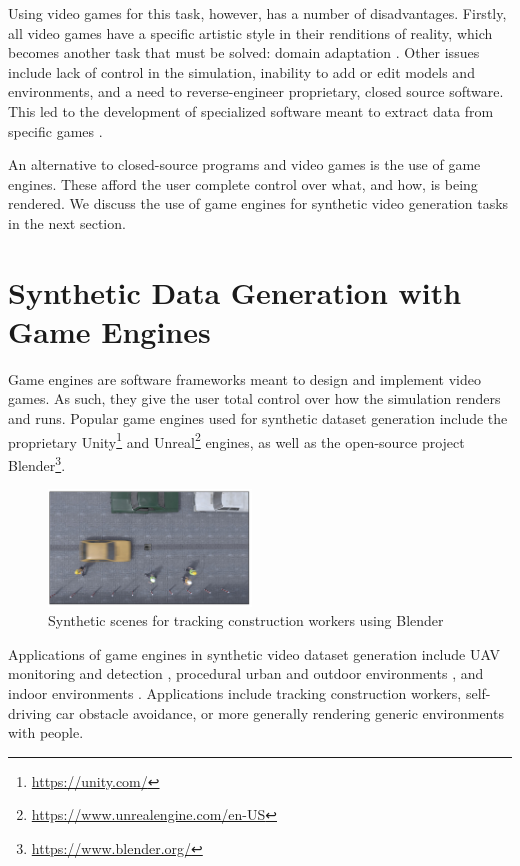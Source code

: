 Using video games for this task, however, has a number of disadvantages. Firstly, all video games have a specific artistic style in their renditions of reality, which becomes another task that must be solved: domain adaptation \cite{wu2019squeezesegv2,wang2019learning}. Other issues include lack of control in the simulation, inability to add or edit models and environments, and a need to reverse-engineer proprietary, closed source software. This led to the development of specialized software meant to extract data from specific games \cite{doan2018g2d}.

An alternative to closed-source programs and video games is the use of game engines. These afford the user complete control over what, and how, is being rendered. We discuss the use of game engines for synthetic video generation tasks in the next section.

\section{Synthetic Data Generation with Game Engines}
\label{sec:graphics-engines}

Game engines are software frameworks meant to design and implement video games. As such, they give the user total control over how the simulation renders and runs. Popular game engines used for synthetic dataset generation include the proprietary Unity\footnote{\url{https://unity.com/}} and Unreal\footnote{\url{https://www.unrealengine.com/en-US}} engines, as well as the open-source project Blender\footnote{\url{https://www.blender.org/}}.


\begin{figure}
    \centering
    \includegraphics[width=0.48\textwidth]{src/img/reated-pics/construction-worker-tracking.jpg}
    \caption{Synthetic scenes for tracking construction workers using Blender\cite{neuhausen2020using}}
    \label{fig:relatex-example-construction-workers}
\end{figure}


Applications of game engines in synthetic video dataset generation include UAV monitoring and detection \cite{barisic2022sim2air}, procedural urban and outdoor environments \cite{ros2016synthia,khan2019procsy,stein2018genesis}, and indoor environments \cite{martinez2021unrealrox+}. Applications include tracking construction workers\cite{neuhausen2020using}, self-driving car obstacle avoidance\cite{bhandari2018procedural,pouyanfar2019roads}, or more generally rendering generic environments with people\cite{kerim2021nova}.

